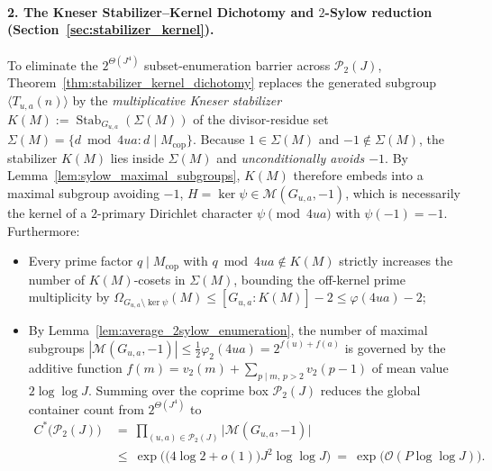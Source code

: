 \documentclass[11pt, a4paper]{article}
\theoremstyle{plain}
\theoremstyle{definition}
\begin{document}
\paragraph{2. The Kneser Stabilizer--Kernel Dichotomy and $2$-Sylow reduction (Section~\ref{sec:stabilizer_kernel}).}
To eliminate the $2^{\Theta(J^{4})}$ subset-enumeration barrier across $\mathcal{P}_2(J)$, Theorem~\ref{thm:stabilizer_kernel_dichotomy} replaces the generated subgroup $\langle T_{u,a}(n)\rangle$ by the \emph{multiplicative Kneser stabilizer} $K(M):=\operatorname{Stab}_{G_{u,a}}(\Sigma(M))$ of the divisor-residue set $\Sigma(M)=\{d\bmod 4ua:d\mid M_{\mathrm{cop}}\}$. Because $1\in\Sigma(M)$ and $-1\notin\Sigma(M)$, the stabilizer $K(M)$ lies inside $\Sigma(M)$ and \emph{unconditionally avoids $-1$}. By Lemma~\ref{lem:sylow_maximal_subgroups}, $K(M)$ therefore embeds into a maximal subgroup avoiding $-1$, $H=\ker\psi\in\mathcal{M}(G_{u,a},-1)$, which is necessarily the kernel of a $2$-primary Dirichlet character $\psi\pmod{4ua}$ with $\psi(-1)=-1$. Furthermore:
\begin{itemize}
    \item Every prime factor $q\mid M_{\mathrm{cop}}$ with $q\bmod 4ua\notin K(M)$ strictly increases the number of $K(M)$-cosets in $\Sigma(M)$, bounding the off-kernel prime multiplicity by $\Omega_{G_{u,a}\setminus\ker\psi}(M)\le[G_{u,a}:K(M)]-2\le\varphi(4ua)-2$;
    \item By Lemma~\ref{lem:average_2sylow_enumeration}, the number of maximal subgroups $|\mathcal{M}(G_{u,a},-1)|\le\frac12\varphi_2(4ua)=2^{f(u)+f(a)}$ is governed by the additive function $f(m)=v_2(m)+\sum_{p\mid m,\,p>2}v_2(p-1)$ of mean value $2\log\log J$. Summing over the coprime box $\mathcal{P}_2(J)$ reduces the global container count from $2^{\Theta(J^{4})}$ to
    \[
    \begin{aligned}
    C^{\ast}\big(\mathcal{P}_2(J)\big)\ &=\ \prod_{(u,a)\in\mathcal{P}_2(J)}\big|\mathcal{M}(G_{u,a},-1)\big|\\
    &\le\ \exp\!\Big(\big(4\log 2+o(1)\big)J^{2}\log\log J\Big)\ =\ \exp\!\big(\mathcal{O}(P\log\log J)\big).
    \end{aligned}
    \]
\end{itemize}
\end{document}
